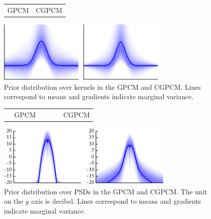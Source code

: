 \documentclass{article}
\begin{document}
\begin{figure}[t]
    \centering
    \begin{tabularx}{\linewidth}{>{\centering}X>{\centering}X}
        GPCM & CGPCM
    \end{tabularx}
    \includegraphics[width=\linewidth, height=3cm]{resources/cropped/prior.pdf}
    \caption{Prior distribution over kernels in the GPCM and CGPCM. Lines correspond to means and gradients indicate marginal variance.}
    \label{fig:prior}
\end{figure}
\begin{figure}[t]
    \centering
    \begin{tabularx}{\linewidth}{>{\centering}X>{\centering}X}
        ~~GPCM & ~~~~~~CGPCM
    \end{tabularx}
    \includegraphics[width=\linewidth, height=3cm]{resources/cropped/prior_psd.pdf}
    \caption{Prior distribution over PSDs in the GPCM and CGPCM. The unit on the $y$ axis is decibel. Lines correspond to means and gradients indicate marginal variance.}
    \label{fig:prior_psd}
\end{figure}
\end{document}
